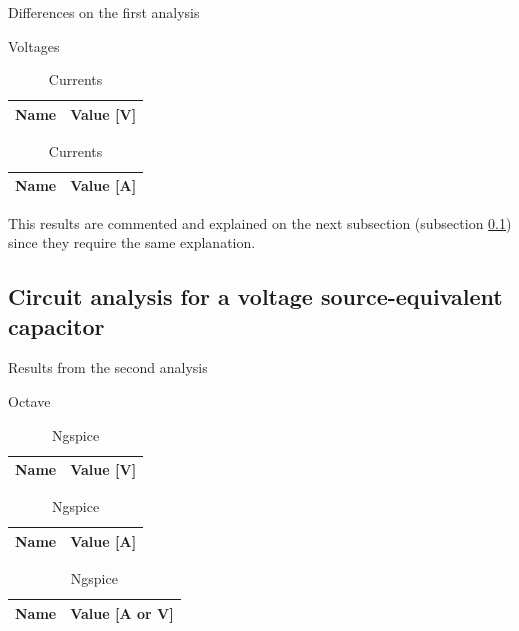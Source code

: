 \begin{table}[H]
    \caption{Differences on the first analysis}
    \begin{subtable}{.5\linewidth}
      \centering
        \caption{Voltages}
        \begin{tabular}{ll}
        \hline    
        {\bf Name} & {\bf Value [V]} \\ \hline
        
        \end{tabular}
        \label{tab:OpVDiff}
    \end{subtable}%
    \begin{subtable}{.5\linewidth}
      \centering
        \caption{Currents}
        \begin{tabular}{ll}
        \hline    
        {\bf Name} & {\bf Value [A]} \\ \hline
        
        \end{tabular}
        \label{tab:OpCDiff}
    \end{subtable} 
    \label{tab:OpDiff}
\end{table}

This results are commented and explained on the next subsection (subsection \ref{subsection:CAVS}) since they require the same explanation.

\subsection{Circuit analysis for a voltage source-equivalent capacitor}
\label{subsection:CAVS}
\begin{table}[H]
    \caption{Results from the second analysis}
    \begin{subtable}{.5\linewidth}
      \centering
        \caption{Octave}
        \begin{tabular}{ll}
        \hline    
        {\bf Name} & {\bf Value [V]} \\ \hline
        
        \end{tabular}
        \begin{tabular}{ll}
        \hline    
        {\bf Name} & {\bf Value [A]} \\ \hline
        
        \end{tabular}
        \label{tab:Op2Oc}
    \end{subtable}%
    \begin{subtable}{.5\linewidth}
      \centering
        \caption{Ngspice}
        \begin{tabular}{ll}
        \hline    
        {\bf Name} & {\bf Value [A or V]} \\ \hline
        
        \end{tabular}
        \label{tab:Op2Ngs}
    \end{subtable} 
    \label{tab:Op2}
\end{table}


